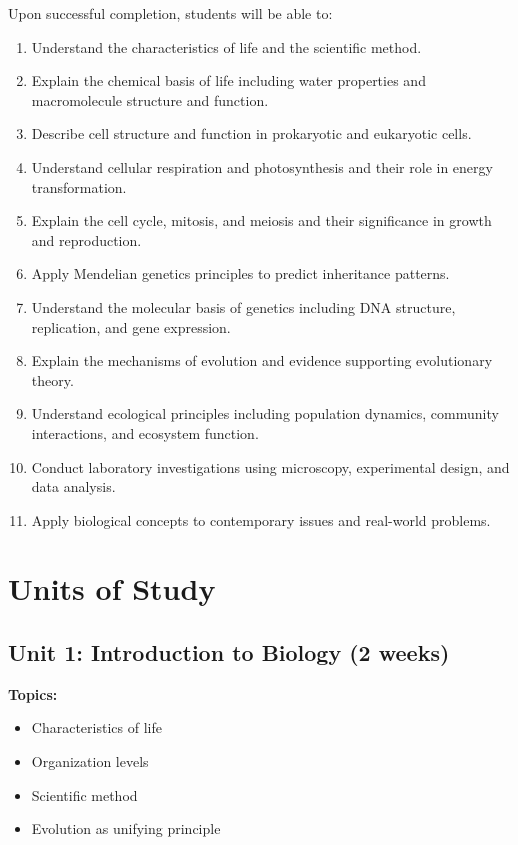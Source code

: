 \documentclass[12pt,oneside]{book}
\begin{document}
Upon successful completion, students will be able to:

\begin{enumerate}
    \item Understand the characteristics of life and the scientific method.
    \item Explain the chemical basis of life including water properties and macromolecule structure and function.
    \item Describe cell structure and function in prokaryotic and eukaryotic cells.
    \item Understand cellular respiration and photosynthesis and their role in energy transformation.
    \item Explain the cell cycle, mitosis, and meiosis and their significance in growth and reproduction.
    \item Apply Mendelian genetics principles to predict inheritance patterns.
    \item Understand the molecular basis of genetics including DNA structure, replication, and gene expression.
    \item Explain the mechanisms of evolution and evidence supporting evolutionary theory.
    \item Understand ecological principles including population dynamics, community interactions, and ecosystem function.
    \item Conduct laboratory investigations using microscopy, experimental design, and data analysis.
    \item Apply biological concepts to contemporary issues and real-world problems.
\end{enumerate}


\section{Units of Study}

\subsection{Unit 1: Introduction to Biology (2 weeks)}

\textbf{Topics:}
\begin{itemize}
    \item Characteristics of life
    \item Organization levels
    \item Scientific method
    \item Evolution as unifying principle
\end{itemize}
\end{document}
